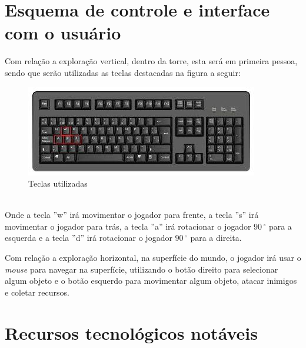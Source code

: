 \documentclass[11pt]{article} %
\begin{document}
\section*{Esquema de controle e interface com o usuário}
Com relação a exploração vertical, dentro da torre, esta será em primeira pessoa, sendo que serão utilizadas as teclas destacadas na figura a seguir:\\
\begin{figure}[!htp]
\centering
\includegraphics[scale=0.75]{res/keyboard.jpg}
\caption{Teclas utilizadas}
\label{Teclado}
\end{figure}
\\Onde a tecla ''w'' irá movimentar o jogador para frente, a tecla ''s'' irá movimentar o jogador para trás, a tecla ''a'' irá rotacionar o jogador $90\,^{\circ}$ para a esquerda e a tecla ''d'' irá rotacionar o jogador $90\,^{\circ}$ para a direita.

Com relação a exploração horizontal, na superfície do mundo, o jogador irá usar o \textit{mouse} para navegar na superfície, utilizando o botão direito para selecionar algum objeto e o botão esquerdo para movimentar algum objeto, atacar inimigos e coletar recursos. 
\section*{Recursos tecnológicos notáveis}
\end{document}
